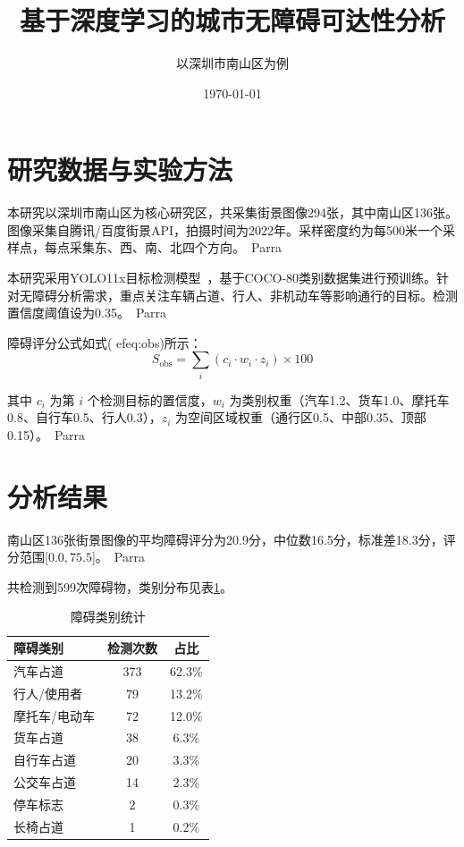 \documentclass{article}
\begin{document}
\title{基于深度学习的城市无障碍可达性分析}
\subtitle{以深圳市南山区为例}
\date{\today}
\maketitle

\section{研究数据与实验方法}

本研究以深圳市南山区为核心研究区，共采集街景图像294张，其中南山区136张。图像采集自腾讯/百度街景API，拍摄时间为2022年。采样密度约为每500米一个采样点，每点采集东、西、南、北四个方向。\ Parra

本研究采用YOLO11x目标检测模型~\cite{yolo11}，基于COCO-80类别数据集进行预训练。针对无障碍分析需求，重点关注车辆占道、行人、非机动车等影响通行的目标。检测置信度阈值设为0.35。\ Parra

障碍评分公式如式(
ef{eq:obs})所示：
\begin{equation}
S_{\text{obs}} = \sum_{i} (c_i \cdot w_i \cdot z_i) \times 100
\end{equation}

其中 $c_i$ 为第 $i$ 个检测目标的置信度，$w_i$ 为类别权重（汽车1.2、货车1.0、摩托车0.8、自行车0.5、行人0.3），$z_i$ 为空间区域权重（通行区0.5、中部0.35、顶部0.15）。\ Parra

\section{分析结果}

南山区136张街景图像的平均障碍评分为20.9分，中位数16.5分，标准差18.3分，评分范围[$0.0, 75.5$]。\ Parra

共检测到599次障碍物，类别分布见表\ref{tab:cat}。
\begin{table}[h]
\centering
\caption{障碍类别统计}\label{tab:cat}
\begin{tabular}{lcc}
\toprule
障碍类别 & 检测次数 & 占比 \\ \midrule
汽车占道 & 373 & 62.3\% \\
行人/使用者 & 79 & 13.2\% \\
摩托车/电动车 & 72 & 12.0\% \\
货车占道 & 38 & 6.3\% \\
自行车占道 & 20 & 3.3\% \\
公交车占道 & 14 & 2.3\% \\
停车标志 & 2 & 0.3\% \\
长椅占道 & 1 & 0.2\% \\
\bottomrule
\end{tabular}
\end{table}
\end{document}
